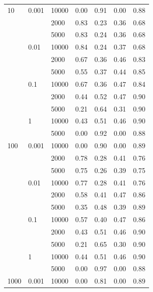 \documentclass[a4paper,10pt]{article}
\begin{document}
\begin{table}[!ht]
\begin{multicols}{2}
\begin{scriptsize}
\begin{tabular}{|lllrrrr|}
10 & 0.001 & 10000 &       0.00 &       0.91 &       0.00 &       0.88 \\
      &       & 2000 &       0.83 &       0.23 &       0.36 &       0.68 \\
      &       & 5000 &       0.83 &       0.24 &       0.36 &       0.68 \\
      & 0.01 & 10000 &       0.84 &       0.24 &       0.37 &       0.68 \\
      &       & 2000 &       0.67 &       0.36 &       0.46 &       0.83 \\
      &       & 5000 &       0.55 &       0.37 &       0.44 &       0.85 \\
      & 0.1 & 10000 &       0.67 &       0.36 &       0.47 &       0.84 \\
      &       & 2000 &       0.44 &       0.52 &       0.47 &       0.90 \\
      &       & 5000 &       0.21 &       0.64 &       0.31 &       0.90 \\
      & 1 & 10000 &       0.43 &       0.51 &       0.46 &       0.90 \\
      &       & 5000 &       0.00 &       0.92 &       0.00 &       0.88 \\
100 & 0.001 & 10000 &       0.00 &       0.90 &       0.00 &       0.89 \\
      &       & 2000 &       0.78 &       0.28 &       0.41 &       0.76 \\
      &       & 5000 &       0.75 &       0.26 &       0.39 &       0.75 \\
      & 0.01 & 10000 &       0.77 &       0.28 &       0.41 &       0.76 \\
      &       & 2000 &       0.58 &       0.41 &       0.47 &       0.86 \\
      &       & 5000 &       0.35 &       0.48 &       0.39 &       0.89 \\
      & 0.1 & 10000 &       0.57 &       0.40 &       0.47 &       0.86 \\
      &       & 2000 &       0.43 &       0.51 &       0.46 &       0.90 \\
      &       & 5000 &       0.21 &       0.65 &       0.30 &       0.90 \\
      & 1 & 10000 &       0.44 &       0.51 &       0.46 &       0.90 \\
      &       & 5000 &       0.00 &       0.97 &       0.00 &       0.88 \\
1000 & 0.001 & 10000 &       0.00 &       0.81 &       0.00 &       0.89 \\

\end{tabular}
\end{scriptsize}
\end{multicols}
\end{table}
\end{document}
